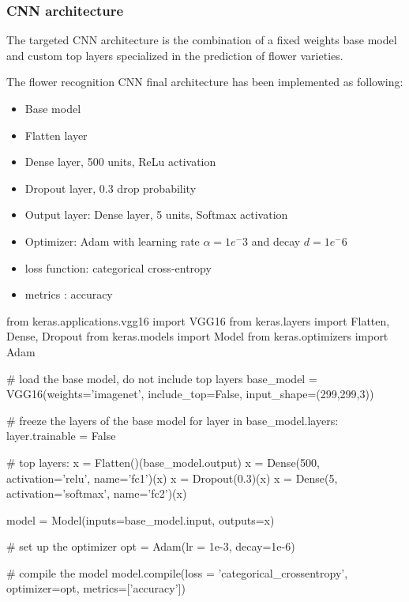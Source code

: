 \subsubsection{CNN architecture}
The targeted CNN architecture is the combination of a fixed weights base model and custom top layers specialized in the prediction of flower varieties.

The flower recognition CNN final architecture has been implemented as following:

\begin{itemize}
	\setlength\itemsep{1pt}
	\setlength{\parskip}{0pt}
	\setlength{\parsep}{0pt}
	\item Base model
	\item Flatten layer
	\item Dense layer, 500 units, ReLu activation
	\item Dropout layer, 0.3 drop probability
	\item Output layer: Dense layer, 5 units, Softmax activation
	\item Optimizer: Adam with learning rate $\alpha=1e^-3$ and decay $d=1e^-6$ 
	\item loss function: categorical cross-entropy
	\item metrics : accuracy
\end{itemize}

\begin{python}
from keras.applications.vgg16 import VGG16
from keras.layers import Flatten, Dense, Dropout
from keras.models import Model
from keras.optimizers import Adam

# load the base model, do not include top layers
base_model = VGG16(weights='imagenet', include_top=False, input_shape=(299,299,3))  

# freeze the layers of the base model
for layer in base_model.layers:
	layer.trainable = False   

# top layers:
x = Flatten()(base_model.output)
x = Dense(500, activation='relu', name='fc1')(x)
x = Dropout(0.3)(x)
x = Dense(5, activation='softmax', name='fc2')(x)

model = Model(inputs=base_model.input, outputs=x)

# set up the optimizer
opt = Adam(lr = 1e-3, decay=1e-6)

# compile the model
model.compile(loss = 'categorical_crossentropy', optimizer=opt, metrics=['accuracy'])
\end{python}

